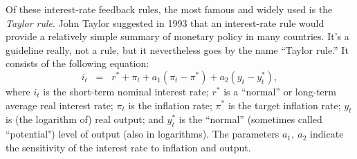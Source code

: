 Of these interest-rate feedback rules, the most famous and widely used is the {\it Taylor rule\/}.
John Taylor 
suggested in 1993 that an interest-rate rule would provide a
relatively simple summary of monetary policy in many countries.
It's a guideline really, not a rule, but it nevertheless goes
by the name ``Taylor rule.''
It consists of the following equation:
\begin{equation}
    i_t  \;\;=\;\;  r^* + \pi_t + a_1 (\pi_t - \pi^*)
            + a_2 (y_t - y_t^* )   ,
    \label{eq:taylorrule}
\end{equation}
where $i_t$ is the short-term nominal interest rate;
$r^*$ is a ``normal'' or long-term average real interest rate;
$\pi_t  $ is the inflation rate;
$\pi^*$ is the target inflation rate;
$y_t$ is (the logarithm of) real output;
and $y_t^*$ is the ``normal'' (sometimes called ``potential") level of output (also in logarithms).
The parameters $a_1,\ a_2$ indicate the sensitivity of the interest rate to
inflation and output.


